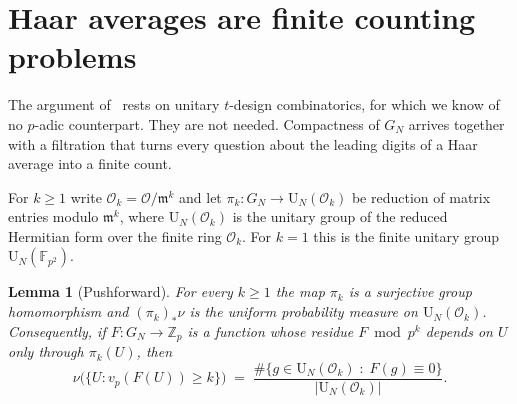 \documentclass{ceurart}
\theoremstyle{plain}
\newtheorem{lemma}[theorem]{Lemma}
\theoremstyle{definition}
\theoremstyle{remark}
\theoremstyle{plain}
\newcommand{\Zp}{\mathbb{Z}_p}
\newcommand{\OK}{\mathcal{O}}
\newcommand{\mm}{\mathfrak{m}}
\newcommand{\Uni}{\mathrm{U}}
\newcommand{\FF}{\mathbb{F}}
\begin{document}
\section{Haar averages are finite counting problems}
\label{sec:counting}

The argument of~\cite{Mc18} rests on unitary $t$-design combinatorics, for
which we know of no $p$-adic counterpart. They are not needed. Compactness of
$G_N$ arrives together with a filtration that turns every question about the
leading digits of a Haar average into a finite count.

For $k\ge1$ write $\OK_k=\OK/\mm^{k}$ and let
$\pi_k:G_N\to \Uni_N(\OK_k)$ be reduction of matrix entries modulo $\mm^k$,
where $\Uni_N(\OK_k)$ is the unitary group of the reduced Hermitian form over
the finite ring $\OK_k$. For $k=1$ this is the finite unitary group
$\Uni_N(\FF_{p^2})$.

\begin{lemma}[Pushforward]
\label{lem:pushforward}
For every $k\ge1$ the map $\pi_k$ is a surjective group homomorphism and
$(\pi_k)_\ast\nu$ is the uniform probability measure on $\Uni_N(\OK_k)$.
Consequently, if $F:G_N\to\Zp$ is a function whose residue $F\bmod p^{k}$
depends on $U$ only through $\pi_k(U)$, then
\[
  \nu\bigl(\{U: v_p(F(U))\ge k\}\bigr)
  \;=\;\frac{\#\{g\in \Uni_N(\OK_k)\;:\;F(g)\equiv0\}}
            {\bigl|\Uni_N(\OK_k)\bigr|}.
\]
\end{lemma}
\end{document}
